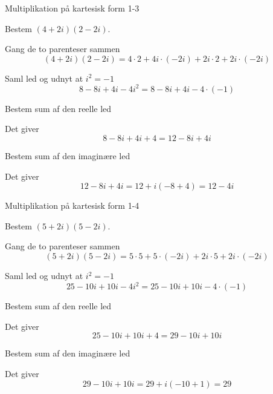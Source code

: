 \documentclass{article}
\begin{document}
\newpage

\begin{exercise}{Multiplikation på kartesisk form 1-3}
	
	Bestem $(4+2i)(2-2i)$.
	
	
	\hint
	
	Gang de to parenteser sammen
	\[
	(4+2i)(2-2i) = 4 \cdot 2 + 4i \cdot (-2i) + 2i \cdot 2 + 2i \cdot (-2i)
	\]
	
	\hint 
	
	Saml led og udnyt at $i^2 = -1$
	\[
	8 - 8i + 4i - 4i^2 = 8 - 8i +4i -4 \cdot (-1)
	\]
	
	\hint
	
	Bestem sum af den reelle led
	
	\hint
	
	Det giver
	\[
	8 - 8i +4i +4 =  12 - 8i +4i
	\]
	
	\hint
	
	Bestem sum af den imaginære led
	
	
	\hint
	
	Det giver 
	\[
	12 - 8i +4i = 12 + i(-8+4) = 12 - 4i
	\]
	
\end{exercise}

\newpage

\begin{exercise}{Multiplikation på kartesisk form 1-4}
	
	Bestem $(5+2i)(5-2i)$.
	
	
	\hint
	
	Gang de to parenteser sammen
	\[
	(5+2i)(5-2i) = 5 \cdot 5 + 5 \cdot (-2i) + 2i \cdot 5 + 2i \cdot (-2i)
	\]
	
	\hint 
	
	Saml led og udnyt at $i^2 = -1$
	\[
	25 -10i +10i -4i^2 = 25 - 10i + 10i -4 \cdot (-1)
	\]
	
	\hint
	
	Bestem sum af den reelle led
	
	\hint
	
	Det giver
	\[
	25 - 10i + 10i +4 = 29 -10i + 10i
	\]
	
	\hint
	
	Bestem sum af den imaginære led
	
	
	\hint
	
	Det giver 
	\[
	29 -10i + 10i = 29 + i(-10+1) = 29
	\]
	
\end{exercise}
\end{document}
